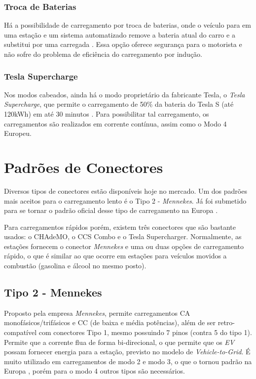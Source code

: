       \subsubsection{Troca de Baterias}
      \label{stateofart:modes:other:swap}

        Há a possibilidade de carregamento por troca de baterias, onde o veículo para em uma estação e um sistema automatizado remove a bateria atual do carro e a substitui por uma carregada \cite{battery-swap}. Essa opção oferece segurança para o motorista e não sofre do problema de eficiência do carregamento por indução. 

      \subsubsection{Tesla Supercharge}
      \label{stateofart:modes:tesla}

        Nos modos cabeados, ainda há o modo proprietário da fabricante Tesla, o \textit{Tesla Supercharge}, que permite o carregamento de 50\% da bateria do Tesla S (até 120kWh) em até 30 minutos \cite{tesla-supercharge}. Para possibilitar tal carregamento, os carregamentos são realizados em corrente contínua, assim como o Modo 4 Europeu.

  \section{Padrões de Conectores}
  \label{stateofart:plugs}

      Diversos tipos de conectores estão disponíveis hoje no mercado. Um dos padrões mais aceitos para o carregamento lento é o Tipo 2 - \textit{Mennekes}. Já foi submetido para se tornar o padrão oficial desse tipo de carregamento na Europa \cite{mckinsey-report-ev}.

      Para carregamentos rápidos porém, existem três conectores que são bastante usados: o CHAdeMO, o CCS Combo e o Tesla Supercharger. Normalmente, as estações fornecem o conector \textit{Mennekes} e uma ou duas opções de carregamento rápido, o que é similar ao que ocorre em estações para veículos movidos a combustão (gasolina e álcool no mesmo posto).

      \subsection{Tipo 2 - Mennekes}
      \label{stateofart:plugs:mennekes}

        Proposto pela empresa \textit{Mennekes}, permite carregamentos \ac{CA} monofásicos/trifásicos e \ac{CC} (de baixa e média potências), além de ser retro-compatível com conectores Tipo 1, mesmo possuindo 7 pinos (contra 5 do tipo 1). Permite que a corrente flua de forma bi-direcional, o que permite que os \textit{\ac{EV}} possam fornecer energia para a estação, previsto no modelo de \textit{Vehicle-to-Grid}. É muito utilizado em carregamentos de modo 2 e modo 3, o que o tornou padrão na Europa \cite{mennekes-news-standardplug}, porém para o modo 4 outros tipos são necessários.

